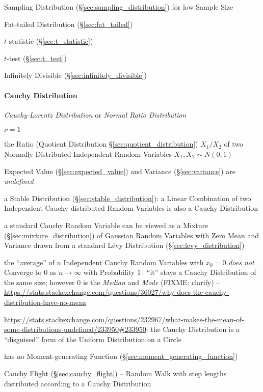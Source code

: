 Sampling Distribution (\S\ref{sec:sampling_distribution}) for low Sample Size

Fat-tailed Distribution (\S\ref{sec:fat_tailed})

$t$-statistic (\S\ref{sec:t_statistic})

$t$-test (\S\ref{sec:t_test})

Infinitely Divisible (\S\ref{sec:infinitely_divisible})



\paragraph{Cauchy Distribution}\label{sec:cauchy_distribution}\hfill

\emph{Cauchy-Lorentz Distribution} or \emph{Normal Ratio Distribution}

$\nu = 1$

the Ratio (Quotient Distribution \S\ref{sec:quotient_distribution}) $X_1/X_2$ of
two Normally Distributed Independent Random Variables $X_1, X_2 \sim N(0,1)$

Expected Value (\S\ref{sec:expected_value}) and Variance (\S\ref{sec:variance})
are \emph{undefined}

a Stable Distribution (\S\ref{sec:stable_distribution}): a Linear Combination of
two Independent Cauchy-distributed Random Variables is also a Cauchy
Distribution

a standard Cauchy Random Variable can be viewed as a Mixture
(\S\ref{sec:mixture_distribution}) of Gaussian Random Variables with Zero Mean
and Variance drawn from a standard L\'evy Distribution
(\S\ref{sec:levy_distribution})

the ``average'' of $n$ Independent Cauchy Random Variables with $x_0 = 0$
\emph{does not} Converge to $0$ as $n \to \infty$ with Probability $1$-- ``it''
stays a Cauchy Distribution of the same size; however $0$ is the \emph{Median}
and \emph{Mode} (FIXME: clarify)
--\url{https://stats.stackexchange.com/questions/36027/why-does-the-cauchy-distribution-have-no-mean}

\url{https://stats.stackexchange.com/questions/232967/what-makes-the-mean-of-some-distributions-undefined/233950#233950}:
the Cauchy Distribution is a ``disguised'' form of the Uniform Distribution on a
Circle

has no Moment-generating Function (\S\ref{sec:moment_generating_function})

Cauchy Flight (\S\ref{sec:cauchy_flight}) -- Random Walk with step lengths
distributed according to a Cauchy Distribution



